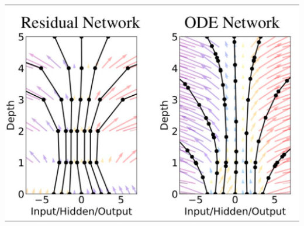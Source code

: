 \documentclass[10pt,a4paper]{article}
\theoremstyle{definition}
\theoremstyle{definition}
\begin{document}
\begin{center}
\includegraphics[scale=0.7]{resnetvsodenet.png}
\end{center}


\end{document}
